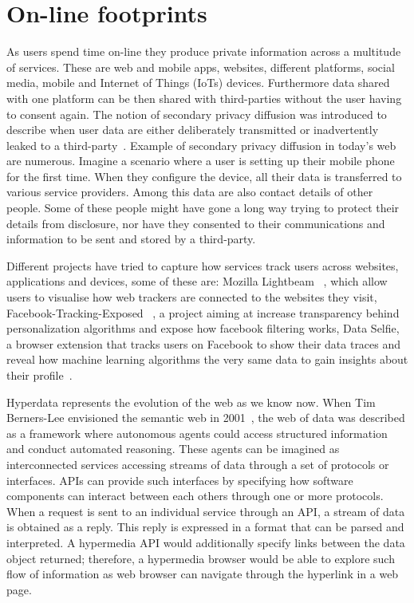 \section{On-line footprints}

As users spend time on-line they produce private information across a multitude of services. These are web and mobile apps, websites, different platforms, social media, mobile and Internet of Things (IoTs) devices. Furthermore data shared with one platform can be then shared with third-parties without the user having to consent again. The notion of secondary privacy diffusion was introduced to describe when user data are either deliberately transmitted or inadvertently leaked to a third-party~\cite{krishnamurthy2009privacy}. Example of secondary privacy diffusion in today's web are numerous. Imagine a scenario where a user is setting up their mobile phone for the first time. When they configure the device, all their data is transferred to various service providers. Among this data are also contact details of other people. Some of these people might have gone a long way trying to protect their details from disclosure, nor have they consented to their communications and information to be sent and stored by a third-party. 

Different projects have tried to capture how services track users across websites, applications and devices, some of these are: Mozilla Lightbeam ~\cite{lightbeam}, which allow users to visualise how web trackers are connected to the websites they visit, Facebook-Tracking-Exposed ~\cite{FTE}, a project aiming at increase transparency behind personalization algorithms and expose how facebook filtering works, Data Selfie, a browser extension that tracks users on Facebook to show their data traces and reveal how machine learning algorithms the very same data to gain insights about their profile~\cite{data-selfie}.

Hyperdata represents the evolution of the web as we know now. When Tim Berners-­Lee envisioned the semantic web in 2001~\cite{SciAMMag}, the web of data was described as a framework where autonomous agents could access structured information and conduct automated reasoning. These agents can be imagined as interconnected services accessing streams of data through a set of protocols or interfaces. APIs can provide such interfaces by specifying how software components can interact between each others through one or more protocols. When a request is sent to an individual service through an API, a stream of data is obtained as a reply. This reply is expressed in a format that can be parsed and interpreted. A hypermedia API would additionally specify links between the data object returned; therefore, a hypermedia browser would be able to explore such flow of information as web browser can navigate through the hyperlink in a web page.\\

